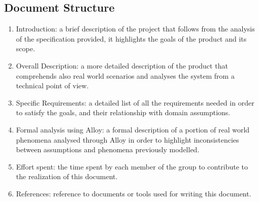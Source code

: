 \subsection{Document Structure} %
\begin{enumerate}
    \item Introduction: a brief description of the project that follows from the analysis of the specification provided, it highlights the goals of the product and its scope.
    \item Overall Description: a more detailed description of the product that comprehends also real world scenarios and analyses the system from a technical point of view.
    \item Specific Requirements: a detailed list of all the requirements needed in order to satisfy the goals, and their relationship with domain assumptions.
    \item Formal analysis using Alloy: a formal description of a portion of real world phenomena analysed through Alloy in order to highlight inconsistencies between assumptions and phenomena previously modelled.
    \item Effort spent: the time spent by each member of the group to contribute to the realization of this document.
    \item References: reference to documents or tools used for writing this document.
\end{enumerate}
